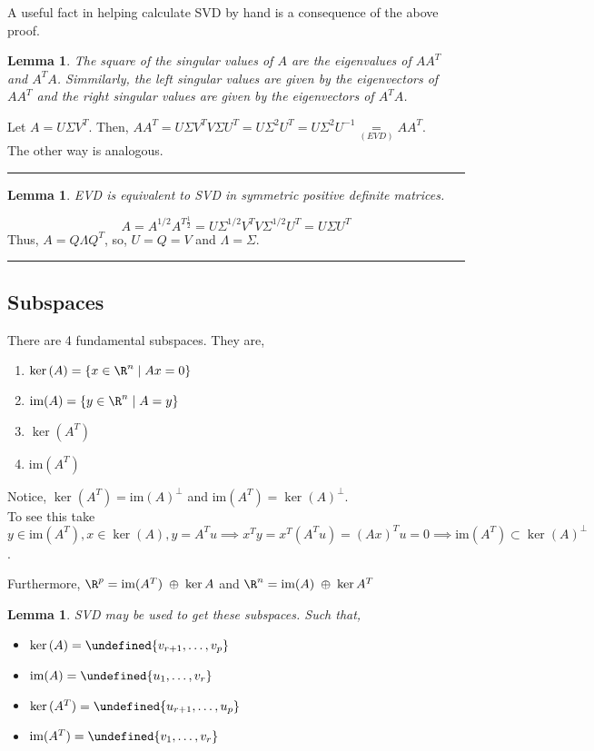 \documentclass[twoside]{article}
\let\span\undefined
\newcommand\span[1]{\text{span}(#1)}
\newcommand\im[1]{\text{im}(#1)}
\newtheorem{lemma}[theorem]{Lemma}
\newenvironment{proof}{{\bf Proof:}}{\hfill\rule{2mm}{2mm}}
\begin{document}
A useful fact in helping calculate SVD by hand is a consequence of the above proof.

\begin{lemma} The square of the singular values of $A$ are the eigenvalues of $AA^T$ and $A^TA$. Simmilarly, the left singular values are given by the eigenvectors of $AA^T$ and the right singular values are given by the eigenvectors of $A^TA$. 
\end{lemma}
\begin{proof} Let $A = U\Sigma V^T$. Then, $AA^T = U\Sigma V^T V \Sigma U^T = U \Sigma^2 U^T = U \Sigma^2 U^{-1} \underset{(EVD)}= AA^T$. \\ The other way is analogous.
\end{proof}


\begin{lemma}EVD  is equivalent to SVD in symmetric positive definite matrices.
\end{lemma}

\begin{proof} $$A = A^{1/2}A^{T\frac{1}{2}} = U\Sigma^{1/2} V^T V \Sigma^{1/2} U^T = U\Sigma U^T$$
Thus, $A = Q\Lambda Q^T$, so, $U=Q=V$ and $\Lambda = \Sigma$.
\end{proof}

\subsection{Subspaces}

There are 4 fundamental subspaces. They are,

\begin{enumerate}
  \item $\ker{(A)} = \{x\in\R^n \;|\; Ax = 0\}$
  \item $\im{A} = \{y\in\R^n \;|\; A = y\}$
  \item $\ker{(A^T)}$
  \item $\im{A^T}$
\end{enumerate}

Notice, $\ker(A^T) = \im{A}^\perp$ and $\im{A^T} = \ker{(A)}^\perp$. 
\\To see this take $y\in\im{A^T}, x \in \ker{(A)}, y = A^Tu \implies x^Ty = x^T(A^Tu) = (Ax)^Tu=0 \implies \im{A^T}\subset\ker{(A)}^\perp$.

 Furthermore, $\R^p = \im{A^T} \; \oplus\;\ker{A}$ and $\R^n = \im{A} \; \oplus\;\ker{A^T}$ 

\begin{lemma}SVD may be used to get these subspaces. Such that,
\begin{itemize}
\item $\ker{(A)} = \span{v_{r+1},\dots,v_p}$
\item $\im{A} = \span{u_{1},\dots,v_r}$
\item $\ker{(A^T)} = \span{u_{r+1},\dots,u_p}$
\item $\im{A^T} = \span{v_{1},\dots,v_r}$
\end{itemize}
\end{lemma}
\end{document}
